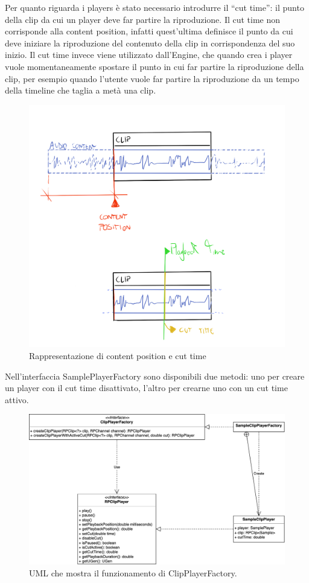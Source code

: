 \documentclass[a4paper,12pt]{report}
\begin{document}
Per quanto riguarda i players è stato necessario introdurre il “cut time”:
il punto della clip da cui un player deve far partire la riproduzione.
Il cut time non corrisponde alla content position, infatti quest’ultima definisce il punto da cui deve iniziare la riproduzione del contenuto della clip in corrispondenza del suo inizio. Il cut time invece viene utilizzato dall’Engine, che quando crea i player vuole momentaneamente spostare il punto in cui far partire la riproduzione della clip, per esempio quando l’utente vuole far partire la riproduzione da un tempo della timeline che taglia a metà una clip.

\begin{figure}[H]
\centering{}
\includegraphics[scale=0.27]{img/clipModel.png}
\caption{Rappresentazione di content position e cut time}
\end{figure}

Nell'interfaccia SamplePlayerFactory sono disponibili due metodi: uno per creare un player con il cut time disattivato, l’altro per crearne uno con un cut time attivo.

\begin{figure}[H]
\centering{}
\includegraphics[width=\textwidth]{img/clipplayer.png}
\caption{UML che mostra il funzionamento di ClipPlayerFactory.}
\end{figure}
\end{document}
